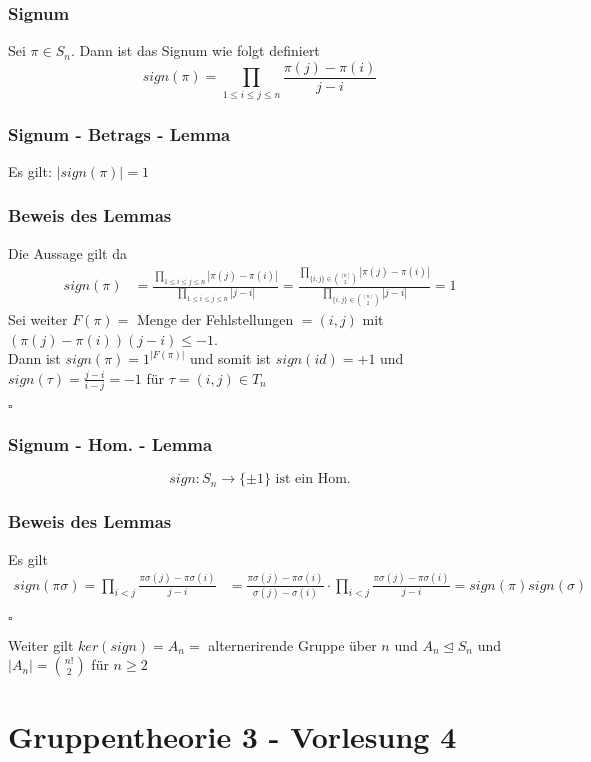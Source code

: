 \documentclass[12pt, german]{article}
\newcommand\ddfrac[2]{\frac{\displaystyle #1}{\displaystyle #2}}
\newcommand{\bewiesen}{

\begin{flushright}
		$\square$  \\
\end{flushright}}
\begin{document}
\subsubsection{Signum}
 	Sei $\pi \in S_n$. Dann ist das Signum wie folgt definiert $$sign(\pi) = \prod_{1 \leq i \leq j \leq n} \frac{\pi(j) - \pi(i)}{j -i}$$

\subsubsection{Signum - Betrags - Lemma}
	Es gilt: $|sign(\pi) |= 1$

\subsubsection{Beweis des Lemmas}
	Die Aussage gilt da 
	\begin{align*}
		sign(\pi) &= \ddfrac{\prod_{1 \leq i \leq j \leq n}  |\pi(j) - \pi(i)|}{\prod_{1 \leq i \leq j \leq n}  |j -i|} = \ddfrac{ \prod_{ \{i,j\} \in \binom{[n]}{2}} |\pi(j) - \pi(i)| }{ \prod_{ \{i,j\} \in \binom{[n]}{2}} |j - i|} = 1
	\end{align*}
	Sei weiter $F(\pi) = $ Menge der Fehlstellungen $= (i,j)$ mit $(\pi(j) - \pi(i))(j-i) \leq -1$. \\
	
	Dann ist $sign(\pi)= 1^{|F(\pi)|}$ und somit ist $sign(id) = +1$ und $sign(\tau) = \frac{j-i}{i-j} = -1$ für $\tau= (i,j) \in T_n$
	\bewiesen

\subsubsection{Signum - Hom. - Lemma}
	$$ sign: S_n \to \{ \pm 1\} \text{ ist ein Hom.}$$

\subsubsection{Beweis des Lemmas}
	Es gilt 
	\begin{align*}
		sign(\pi\sigma) = \prod_{ i < j} \ddfrac{\pi\sigma(j) - \pi \sigma(i)}{j -i} &=  \ddfrac{\pi\sigma(j) - \pi \sigma(i)}{\sigma(j) -\sigma(i)} \cdot \prod_{ i < j}\ddfrac{\pi\sigma(j) - \pi \sigma(i)}{j -i} = sign(\pi) sign(\sigma)
	\end{align*}
	\bewiesen
	Weiter gilt $ker(sign) = A_n = $ alternerirende Gruppe über $n$ und $A_n \trianglelefteq S_n$ und $|A_n| = \binom{n!}{2}$ für $n \geq 2$ 

\section{Gruppentheorie 3 - Vorlesung 4}
\end{document}
